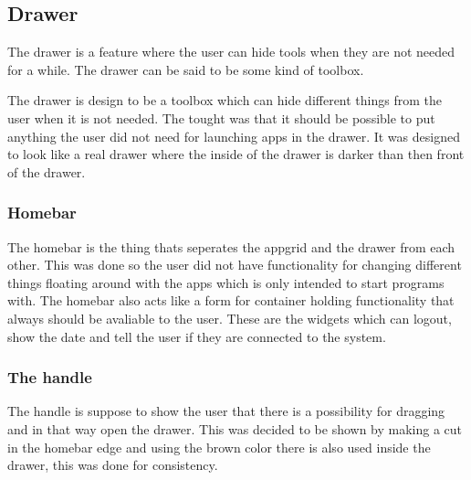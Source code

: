 \subsection{Drawer}
\label{GUI:drawer}

The drawer is a feature where the user can hide tools when they are not needed for a while. The drawer can be said to be some kind of toolbox. 

The drawer is design to be a toolbox which can hide different things from the user when it is not needed. The tought was that it should be possible to put anything the user did not need for launching apps in the drawer. It was designed to look like a real drawer where the inside of the drawer is darker than then front of the drawer.

\subsubsection{Homebar}
The homebar is the thing thats seperates the appgrid and the drawer from each other. This was done so the user did not have functionality for changing different things floating around with the apps which is only intended to start programs with.
The homebar also acts like a form for container holding functionality that always should be avaliable to the user. These are the widgets which can logout, show the date and tell the user if they are connected to the \giraf[] system.


\subsubsection{The handle}
The handle is suppose to show the user that there is a possibility for dragging and in that way open the drawer. This was decided to be shown by making a cut in the homebar edge and using the brown color there is also used inside the drawer, this was done for consistency.
